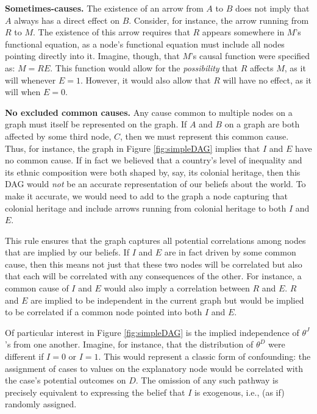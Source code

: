 \documentclass[
  12pt,
]{book}
\begin{document}
\textbf{Sometimes-causes.} The existence of an arrow from \(A\) to \(B\) does not imply that \(A\) always has a direct effect on \(B\). Consider, for instance, the arrow running from \(R\) to \(M\). The existence of this arrow requires that \(R\) appears somewhere in \(M\)'s functional equation, as a node's functional equation must include all nodes pointing directly into it. Imagine, though, that \(M\)'s causal function were specified as: \(M = RE\). This function would allow for the \emph{possibility} that \(R\) affects \(M\), as it will whenever \(E=1\). However, it would also allow that \(R\) will have no effect, as it will when \(E=0\).

\textbf{No excluded common causes.} Any cause common to multiple nodes on a graph must itself be represented on the graph. If \(A\) and \(B\) on a graph are both affected by some third node, \(C\), then we must represent this common cause. Thus, for instance, the graph in Figure \ref{fig:simpleDAG} implies that \(I\) and \(E\) have no common cause. If in fact we believed that a country's level of inequality and its ethnic composition were both shaped by, say, its colonial heritage, then this DAG would \emph{not} be an accurate representation of our beliefs about the world. To make it accurate, we would need to add to the graph a node capturing that colonial heritage and include arrows running from colonial heritage to both \(I\) and \(E\).

This rule ensures that the graph captures all potential correlations among nodes that are implied by our beliefs. If \(I\) and \(E\) are in fact driven by some common cause, then this means not just that these two nodes will be correlated but also that each will be correlated with any consequences of the other. For instance, a common cause of \(I\) and \(E\) would also imply a correlation between \(R\) and \(E\). \(R\) and \(E\) are implied to be independent in the current graph but would be implied to be correlated if a common node pointed into both \(I\) and \(E\).

Of particular interest in Figure \ref{fig:simpleDAG} is the implied independence of \(\theta^J\)'s from one another. Imagine, for instance, that the distribution of \(\theta^D\) were different if \(I=0\) or \(I=1\). This would represent a classic form of confounding: the assignment of cases to values on the explanatory node would be correlated with the case's potential outcomes on \(D\). The omission of any such pathway is precisely equivalent to expressing the belief that \(I\) is exogenous, i.e., (as if) randomly assigned.
\end{document}
